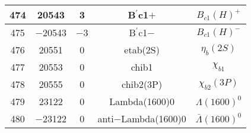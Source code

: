 \documentclass{article}
\begin{document}
\begin{table}[!htbp]
\begin{tabular}{|c|c|c|c|c|}
\hline
474 & 20543 & 3 & B$^{\prime}$\underline{\hspace{0.6em}}c1$+$ & $B_{c1}(H)^{+}$ \\
\hline
475 & $-$20543 & $-$3 & B$^{\prime}$\underline{\hspace{0.6em}}c1$-$ & $B_{c1}(H)^{-}$ \\
\hline
476 & 20551 & 0 & eta\underline{\hspace{0.6em}}b(2S) & $\eta_{b}(2S)$ \\
\hline
477 & 20553 & 0 & chi\underline{\hspace{0.6em}}b1 & $\chi_{b1}$ \\
\hline
478 & 20555 & 0 & chi\underline{\hspace{0.6em}}b2(3P) & $\chi_{b2}(3P)$ \\
\hline
479 & 23122 & 0 & Lambda(1600)0 & $\Lambda(1600)^{0}$ \\
\hline
480 & $-$23122 & 0 & anti$-$Lambda(1600)0 & $\bar{\Lambda}(1600)^{0}$ \\
\hline
\end{tabular}
\end{table}

\clearpage
\end{document}

